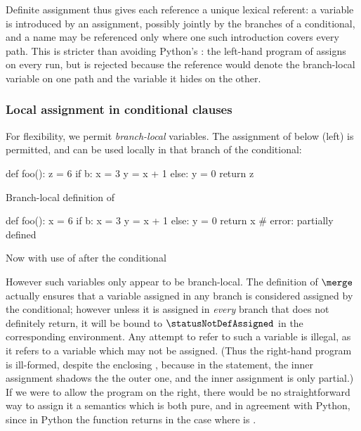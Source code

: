 \begin{PaperOnly}
Definite assignment thus gives each reference a unique lexical referent: a variable is introduced by
an assignment, possibly jointly by the branches of a conditional, and a name may be referenced only where one
such introduction covers every path. This is stricter than avoiding Python's : the
left-hand program of  assigns  on every run, but is rejected because the
reference would denote the branch-local variable on one path and the variable it hides on the other.

\subsubsection{Local assignment in conditional clauses}
\label{sec:local-assignment}

For flexibility, we permit \emph{branch-local} variables. The assignment of  below (left) is
permitted, and can be used locally in that branch of the conditional:

\begin{center}
\begin{minipage}{0.48\textwidth}
\centering
\begin{python}
def foo():
  z = 6
  if b:
    x = 3
    y = x + 1
  else:
    y = 0
  return z
\end{python}

\smallskip

{\small Branch-local definition of }
\end{minipage}
\hfill
\begin{minipage}{0.48\textwidth}
\centering
\begin{python}
def foo():
  x = 6
  if b:
    x = 3
    y = x + 1
  else:
    y = 0
  return x # error: partially defined
\end{python}

\smallskip

{\small Now with use of  after the conditional}
\end{minipage}
\end{center}
\medskip

\noindent However such variables only appear to be branch-local. The definition of $\merge$ actually ensures
that a variable assigned in any branch is considered assigned by the conditional; however unless it is
assigned in \emph{every} branch that does not definitely return, it will be bound to $\statusNotDefAssigned$ in the
corresponding environment. Any attempt to refer to such a variable is illegal, as it refers to a variable
which may not be assigned. (Thus the right-hand program is ill-formed, despite the enclosing ,
because in the  statement, the inner assignment shadows the the outer one, and the inner
assignment is only partial.) If we were to allow the program on the right, there would be no straightforward
way to assign it a semantics which is both pure, and in agreement with Python, since in Python the function
returns  in the case where  is .


\end{PaperOnly}
